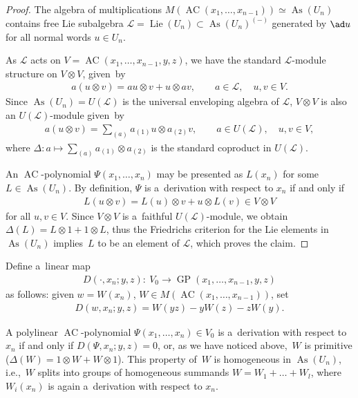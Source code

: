 \begin{proof}
The algebra of multiplications $M(\operatorname{AC}(x_1,\dots, x_{n-1}))\simeq \operatorname{As}(U_n)$ contains free Lie subalgebra $\mathcal L =
\operatorname{Lie}(U_n)\subset \operatorname{As}(U_n)^{(-)}$ generated by $\ad u$ for all normal words $u\in U_n$.

As $\mathcal L$ acts on $V=\operatorname{AC}(x_1,\dots, x_{n-1}, y,z)$, we have the standard $\mathcal L$-module structure on $V\otimes
V$, given~by
\begin{gather*}
a(u\otimes v) = au\otimes v + u\otimes av,
\qquad
a\in \mathcal L,
\quad
u,v\in V.
\end{gather*}
Since $\operatorname{As}(U_n)=U(\mathcal L)$ is the universal enveloping algebra of $\mathcal L$, $V\otimes V $ is also an $U(\mathcal
L)$-module given~by
\begin{gather*}
a(u\otimes v) = \sum\limits_{(a)} a_{(1)}u\otimes a_{(2)}v,
\qquad
a\in U(\mathcal L),
\quad
u,v\in V,
\end{gather*}
where $\Delta:a\mapsto \sum\limits_{(a)} a_{(1)}\otimes a_{(2)}$ is the standard coproduct in $U(\mathcal L)$.

An $\operatorname{AC}$-polynomial $\Psi (x_1,\dots, x_n)$ may be presented as $L(x_n)$ for some $L\in \operatorname{As}(U_n)$.
By def\/inition, $\Psi $ is a~derivation with respect to $x_n$ if and only if
\begin{gather*}
L(u\otimes v) = L(u)\otimes v + u\otimes L(v) \in V\otimes V
\end{gather*}
for all $u,v\in V$.
Since $V\otimes V$ is a~faithful $U(\mathcal L)$-module, we obtain $\Delta (L) = L\otimes 1 + 1\otimes L$, thus the
Friedrichs criterion for the Lie elements in $\operatorname{As}(U_n)$ implies~$L$ to be an element of $\mathcal L$, which proves the
claim.
\end{proof}

Def\/ine a~linear map
\begin{gather*}
D(\cdot, x_n; y,z): \ V_0 \to \operatorname{GP}(x_1,\dots, x_{n-1}, y,z)
\end{gather*}
as follows: given $w=W(x_n)$, $W\in M(\operatorname{AC}(x_1,\dots, x_{n-1}))$, set
\begin{gather*}
D(w, x_n; y,z) = W(yz) - yW(z) - zW(y).
\end{gather*}

A polylinear $\operatorname{AC}$-polynomial $\Psi (x_1,\dots, x_n)\in V_0$ is a~derivation with respect to $x_n$ if and only if $D(\Psi,
x_n; y,z)=0$, or, as we have noticed above,~$W$ is primitive ($\Delta (W) = 1\otimes W + W\otimes 1$).
This property of~$W$ is homogeneous in $\operatorname{As}(U_n)$, i.e.,~$W$ splits into groups of homogeneous summands $W=W_1+\dots+W_l$,
where $W_i(x_n)$ is again a~derivation with respect to $x_n$.

